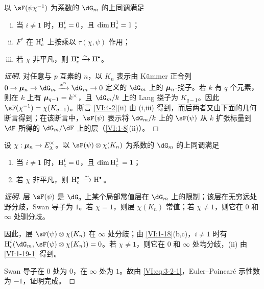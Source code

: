 \begin{proposition_}\label{VI:4-2}
以 $\sF(\psi\chi^{-1})$ 为系数的 $\dG_m$ 的上同调满足
\begin{enumerate}[(i)]
  \item 当 $i\ne 1$ 时，$\operatorname{H}_c^i=0$，且 $\dim \operatorname{H}_c^1=1$；
  \item $F^\ast$ 在 $\operatorname{H}_c^1$ 上按乘以 $\tau(\chi,\psi)$ 作用；
  \item 若 $\chi$ 非平凡，则 $\h_c^\bullet \iso \h^\bullet$。
\end{enumerate}
\end{proposition_}
\begin{proof}[证明]
对任意与 $p$ 互素的 $n$，以 $K_n$ 表示由 K\"ummer 正合列 $0 \to \dmu_n \to \dG_m \xrightarrow{x^n} \dG_m \to 0$ 定义的 $\dG_m$ 上的 ${\bm\mu}_n$-挠子。若 $k$ 有 $q$ 个元素，则在 $k$ 上有 ${\bm\mu}_{q-1}=k^\times$，且 $\dG_m/k$ 上的 Lang 挠子为 $K_{q-1}$。因此 $\sF(\chi^{-1})=\chi(K_{q-1})$。断言 \ref{VI:4-2}(ii) 由 (i,iii) 得到，而后两者又由下面的几何断言得到；在该断言中，$\sF(\psi)$ 表示将 $\dG_m/k$ 上的 $\sF(\psi)$ 从 $k$ 扩张标量到 $\dF$ 所得的 $\dG_m/\dF$ 上的层（\ref{VI:1-8}(ii)）。
\end{proof}

\begin{proposition_}\label{VI:4-3}
设 $\chi:{\bm\mu}_n \to E_\lambda^\times$。以 $\sF(\psi)\otimes \chi(K_n)$ 为系数的 $\dG_m$ 的上同调满足
\begin{enumerate}[\indent (i)]
  \item 当 $i\ne 1$ 时，$\operatorname{H}_c^i=0$，且 $\dim \operatorname{H}_c^1{} = 1$；
  \item 若 $\chi$ 非平凡，则 $\h_c^\bullet{}\iso \h^\bullet{}$。
\end{enumerate}
\end{proposition_}
\begin{proof}[证明]
层 $\sF(\psi)$ 是 $\dG_a$ 上某个局部常值层在 $\dG_m$ 上的限制；该层在无穷远处野分歧，Swan 导子为 $1$。若 $\chi=1$，则层 $\chi(K_n)$ 常值；若 $\chi\ne 1$，则它在 $0$ 和 $\infty$ 处驯分歧。

因此，层 $\sF(\psi)\otimes\chi(K_n)$ 在 $\infty$ 处分歧；由 \ref{VI:1-18}(b,c)，$i\ne 1$ 时有 $\h_c^i(\dG_m,\sF(\psi)\otimes \chi(K_n))=0$。若 $\chi\ne 1$，则它在 $0$ 和 $\infty$ 处均分歧，(ii) 由 \ref{VI:1-19-1} 得到。

Swan 导子在 $0$ 处为 $0$，在 $\infty$ 处为 $1$。故由 \eqref{VI:eq:3-2-1}，Euler--Poincaré 示性数为 $-1$，证明完成。
\end{proof}

